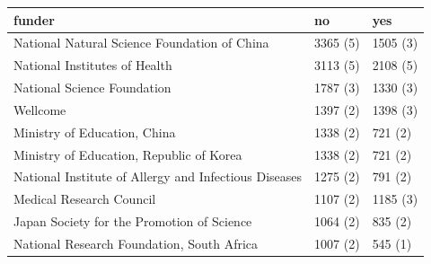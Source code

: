 \begin{table}[ht]
\centering
\begin{tabular}{lll}
 funder & no & yes \\ 
  \hline
National Natural Science Foundation of China & 3365 (5) & 1505 (3) \\ 
  National Institutes of Health & 3113 (5) & 2108 (5) \\ 
  National Science Foundation & 1787 (3) & 1330 (3) \\ 
  Wellcome & 1397 (2) & 1398 (3) \\ 
  Ministry of Education, China & 1338 (2) & 721 (2) \\ 
  Ministry of Education, Republic of Korea & 1338 (2) & 721 (2) \\ 
  National Institute of Allergy and Infectious Diseases & 1275 (2) & 791 (2) \\ 
  Medical Research Council & 1107 (2) & 1185 (3) \\ 
  Japan Society for the Promotion of Science & 1064 (2) & 835 (2) \\ 
  National Research Foundation, South Africa & 1007 (2) & 545 (1) \\ 
  \end{tabular}
\end{table}
